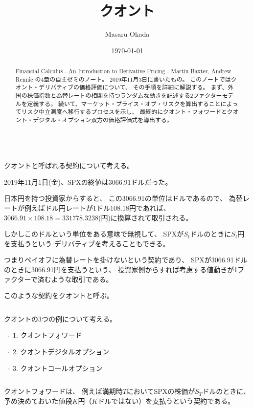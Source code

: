 \documentclass[uplatex,a4j,12pt,dvipdfmx]{jsarticle}
\title{
クオント
}
\author{Masaru Okada}
\date{\today}
\begin{document}
\maketitle

\begin{abstract}
	Financial Calculus - An Introduction to Derivative Pricing - Martin Baxter, Andrew Rennie の4章の自主ゼミのノート。
	2019年11月3日に書いたもの。
    このノートではクオント・デリバティブの価格評価について、
    その手順を詳細に解説する。
    まず、外国の株価指数と為替レートの相関を持つランダムな動きを記述する2ファクターモデルを定義する。
    続いて、マーケット・プライス・オブ・リスクを算出することによってリスク中立測度へ移行するプロセスを示し、
    最終的にクオント・フォワードとクオント・デジタル・オプション双方の価格評価式を導出する。
\end{abstract}

\tableofcontents

\ \\

クオントと呼ばれる契約について考える。

2019年11月1日(金)、SPXの終値は3066.91ドルだった。

日本円を持つ投資家からすると、
この3066.91の単位はドルであるので、
為替レートが例えばドル円レートが1ドル108.18円であれば、
$3066.91 \times 108.18 = 331778.3238$(円)に換算されて取引される。

しかしこのドルという単位をある意味で無視して、
SPXが$S_{t}$ドルのときに$S_{t}$円を支払うという
デリバティブを考えることもできる。

つまりペイオフに為替レートを掛けないという契約であり、
SPXが3066.91ドルのときに3066.91円を支払うという、
投資家側からすれば考慮する値動きが1ファクターで済むような取引である。

このような契約をクオントと呼ぶ。

${}$

クオントの3つの例について考える。

$\hspace{2mm} \cdot$
1. クオントフォワード

$\hspace{2mm} \cdot$
2. クオントデジタルオプション

$\hspace{2mm} \cdot$
3. クオントコールオプション

${}$

クオントフォワードは、
例えば満期時$T$においてSPXの株価が$S_{T}$ドルのときに、
予め決めておいた値段$K$円（$K$ドルではない）を支払うという契約である。
\end{document}
